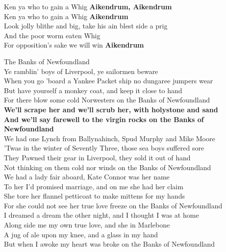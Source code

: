 \documentclass[letterpaper,9pt]{article}
\begin{document}
Ken ya who to gain a Whig \textbf{Aikendrum, Aikendrum} \\
Ken ya who to gain a Whig \textbf{Aikendrum} \\
Look jolly blithe and big, take his ain blest side a prig \\
And the poor worm eaten Whig \\
For opposition's sake we will win \textbf{Aikendrum} \\

\newpage
{}
\Huge
The Banks of Newfoundland\\

\Large
Ye ramblin' boys of Liverpool, ye sailormen beware \\
When you go 'board a Yankee Packet ship no dungaree jumpers wear \\
But have yourself a monkey coat, and keep it close to hand \\
For there blow some cold Norwesters on the Banks of Newfoundland \\
\textbf{We'll scrape her and we'll scrub her, with holystone and sand \\
And we'll say farewell to the virgin rocks on the Banks of Newfoundland} \\

We had one Lynch from Ballynahinch, Spud Murphy and Mike Moore \\
'Twas in the winter of Sevently Three, those sea boys suffered sore \\
They Pawned their gear in Liverpool, they sold it out of hand \\
Not thinking on them cold nor winds on the Banks of Newfoundland \\

We had a lady fair aboard, Kate Connor was her name \\
To her I'd promised marriage, and on me she had her claim \\
She tore her flannel petticoat to make mittens for my hands \\
For she could not see her true love freeze on the Banks of Newfoundland \\

I dreamed a dream the other night, and I thought I was at home \\
Along side me my own true love, and she in Marlebone \\
A jug of ale upon my knee, and a glass in my hand \\
But when I awoke my heart was broke on the Banks of Newfoundland \\
\end{document}
